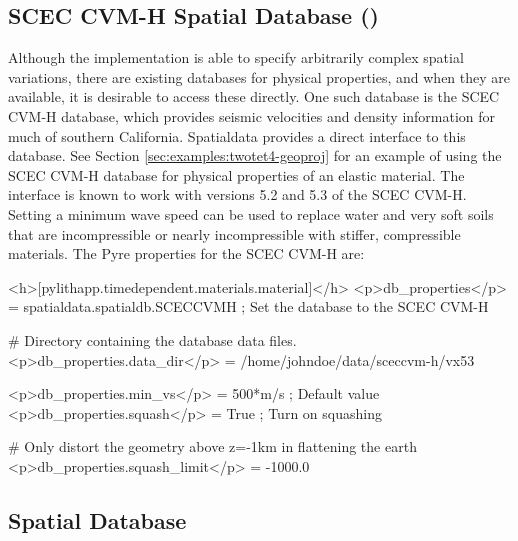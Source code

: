 \subsection{SCEC CVM-H Spatial Database ()}
\label{sec:SCEC:CVM-H}

Although the  implementation is able to specify arbitrarily
complex spatial variations, there are existing databases for physical
properties, and when they are available, it is desirable to access
these directly. One such database is the SCEC CVM-H database, which
provides seismic velocities and density information for much of southern
California. Spatialdata provides a direct interface to this database.
See Section \vref{sec:examples:twotet4-geoproj} for an example of
using the SCEC CVM-H database for physical properties of an elastic
material. The interface is known to work with versions 5.2 and 5.3
of the SCEC CVM-H. Setting a minimum wave speed can be used to replace
water and very soft soils that are incompressible or nearly incompressible
with stiffer, compressible materials. The Pyre properties for the
SCEC CVM-H are:
\begin{inventory}
\end{inventory}

\begin{cfg}
<h>[pylithapp.timedependent.materials.material]</h>
<p>db_properties</p> = spatialdata.spatialdb.SCECCVMH ; Set the database to the SCEC CVM-H

# Directory containing the database data files.
<p>db_properties.data_dir</p> = /home/johndoe/data/sceccvm-h/vx53

<p>db_properties.min_vs</p> = 500*m/s ; Default value
<p>db_properties.squash</p> = True ; Turn on squashing

# Only distort the geometry above z=-1km in flattening the earth
<p>db_properties.squash_limit</p> = -1000.0
\end{cfg}

\subsection{ Spatial Database}

